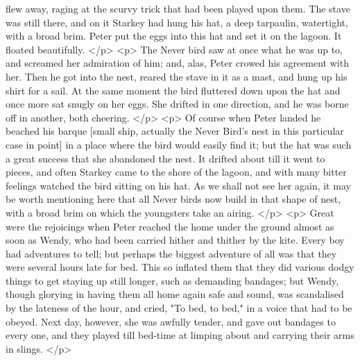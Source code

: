       flew away, raging at the scurvy trick that had been played upon them. The
      stave was still there, and on it Starkey had hung his hat, a deep
      tarpaulin, watertight, with a broad brim. Peter put the eggs into this hat
      and set it on the lagoon. It floated beautifully.
    </p>
    <p>
      The Never bird saw at once what he was up to, and screamed her admiration
      of him; and, alas, Peter crowed his agreement with her. Then he got into
      the nest, reared the stave in it as a mast, and hung up his shirt for a
      sail. At the same moment the bird fluttered down upon the hat and once
      more sat snugly on her eggs. She drifted in one direction, and he was
      borne off in another, both cheering.
    </p>
    <p>
      Of course when Peter landed he beached his barque [small ship, actually
      the Never Bird's nest in this particular case in point] in a place where
      the bird would easily find it; but the hat was such a great success that
      she abandoned the nest. It drifted about till it went to pieces, and often
      Starkey came to the shore of the lagoon, and with many bitter feelings
      watched the bird sitting on his hat. As we shall not see her again, it may
      be worth mentioning here that all Never birds now build in that shape of
      nest, with a broad brim on which the youngsters take an airing.
    </p>
    <p>
      Great were the rejoicings when Peter reached the home under the ground
      almost as soon as Wendy, who had been carried hither and thither by the
      kite. Every boy had adventures to tell; but perhaps the biggest adventure
      of all was that they were several hours late for bed. This so inflated
      them that they did various dodgy things to get staying up still longer,
      such as demanding bandages; but Wendy, though glorying in having them all
      home again safe and sound, was scandalised by the lateness of the hour,
      and cried, "To bed, to bed," in a voice that had to be obeyed. Next day,
      however, she was awfully tender, and gave out bandages to every one, and
      they played till bed-time at limping about and carrying their arms in
      slings.
    </p>
